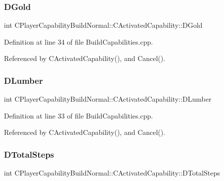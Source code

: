 \subsubsection{\texorpdfstring{D\+Gold}{DGold}}
{\footnotesize\ttfamily int C\+Player\+Capability\+Build\+Normal\+::\+C\+Activated\+Capability\+::\+D\+Gold\hspace{0.3cm}{\ttfamily [protected]}}



Definition at line 34 of file Build\+Capabilities.\+cpp.



Referenced by C\+Activated\+Capability(), and Cancel().

\hypertarget{classCPlayerCapabilityBuildNormal_1_1CActivatedCapability_acc7750973121c2b8ada035bca9264229}{}\label{classCPlayerCapabilityBuildNormal_1_1CActivatedCapability_acc7750973121c2b8ada035bca9264229} 
\subsubsection{\texorpdfstring{D\+Lumber}{DLumber}}
{\footnotesize\ttfamily int C\+Player\+Capability\+Build\+Normal\+::\+C\+Activated\+Capability\+::\+D\+Lumber\hspace{0.3cm}{\ttfamily [protected]}}



Definition at line 33 of file Build\+Capabilities.\+cpp.



Referenced by C\+Activated\+Capability(), and Cancel().

\hypertarget{classCPlayerCapabilityBuildNormal_1_1CActivatedCapability_a50e3103232671fc231348e7a86c1fed5}{}\label{classCPlayerCapabilityBuildNormal_1_1CActivatedCapability_a50e3103232671fc231348e7a86c1fed5} 
\subsubsection{\texorpdfstring{D\+Total\+Steps}{DTotalSteps}}
{\footnotesize\ttfamily int C\+Player\+Capability\+Build\+Normal\+::\+C\+Activated\+Capability\+::\+D\+Total\+Steps\hspace{0.3cm}{\ttfamily [protected]}}



